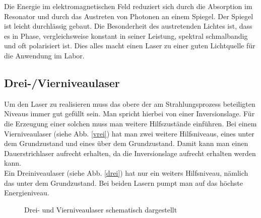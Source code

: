 Die Energie im elektromagnetischen Feld reduziert sich durch die Absorption im Resonator und durch das Austreten von Photonen an einem Spiegel.
Der Spiegel ist leicht durchlässig gebaut. Die Besonderheit des austretenden Lichtes ist, dass es in Phase, vergleichsweise konstant in seiner Leistung, spektral 
schmalbandig und oft polarisiert ist. Dies alles macht einen Laser zu einer guten Lichtquelle für die Anwendung im Labor. 

\clearpage
\subsection{Drei-/Vierniveaulaser}

Um den Laser zu realisieren muss das obere der am Strahlungsprozess beteiligten Niveaus immer gut gefüllt sein. Man spricht
hierbei von einer Inversionslage. Für die Erzeugung einer solchen muss man weitere Hilfszustände
einführen. Bei einem Vierniveaulaser (siehe Abb. \ref{vrei}) hat man zwei weitere Hilfsniveaus, eines unter dem Grundzustand und eines über dem Grundzustand. 
Damit kann man einen Dauerstrichlaser aufrecht erhalten, da die Inversionslage aufrecht erhalten werden kann. \\
Ein Dreiniveaulaser (siehe Abb. \ref{drei}) hat nur ein weiters Hilfsniveau, nämlich das unter dem Grundzustand. Bei beiden Lasern pumpt man auf
das höchste Energieniveau. 

\begin{figure}[ht]
    \centering
    \quad
      \caption{Drei- und Vierniveaulaser schematisch dargestellt \protect \footnotemark}
      \label{bild:LaserNiveaus}
\end{figure}

